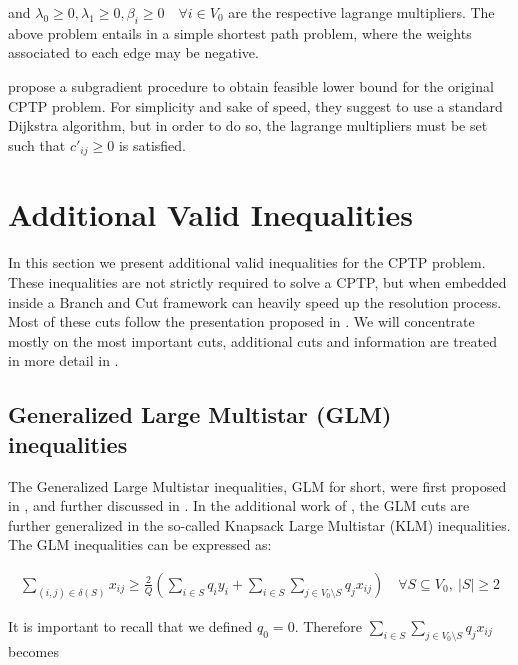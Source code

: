 and $\lambda_0 \ge 0, \lambda_1 \ge 0, \beta_i \ge 0 \quad \forall i \in V_0$ are the respective lagrange multipliers.
The above problem entails in a simple shortest path problem, where the weights associated to each edge may be negative.

\cite{beasley1989algorithm} propose a subgradient procedure to obtain feasible lower bound for the original CPTP problem.
For simplicity and sake of speed, they suggest to use a standard Dijkstra algorithm, but in order to do so, the lagrange multipliers must be set such that $c'_{ij} \ge 0$ is satisfied.




\section{Additional Valid Inequalities}\label{sec:additional-valid-inequalities}

In this section we present additional valid inequalities for the CPTP problem.
These inequalities are not strictly required to solve a CPTP, but when embedded inside a Branch and Cut framework can heavily speed up the resolution process.
Most of these cuts follow the presentation proposed in \cite{Jepsen2014}.
We will concentrate mostly on the most important cuts, additional cuts and information are treated in more detail in \cite{Jepsen2014}.

\subsection{Generalized Large Multistar (GLM) inequalities}
The Generalized Large Multistar inequalities, GLM for short, were first proposed in \cite{gouveia_result_1995}, and further discussed in \cite{letchford2006projection}.
In the additional work of \cite{letchford_multistars_2002}, the GLM cuts are further generalized in the so-called Knapsack Large Multistar (KLM) inequalities.
The GLM inequalities can be expressed as:

\begin{equation}\label{eq:glm-inequality-v1}
	\begin{split}
		\sum_{(i, j) \in \delta(S)} x_{ij} \ge \frac{2}{Q} \left(  \sum_{i \in S} q_i y_i + \sum_{i \in S} \sum_{j \in V_0 \setminus S} q_j  x_{ij}\right) \quad \forall S \subseteq V_0,\ |S| \ge 2
	\end{split}
\end{equation}

It is important to recall that we defined $q_0 = 0$.
Therefore $\sum_{i \in S} \sum_{j \in V_0 \setminus S} q_j  x_{ij}$ becomes

